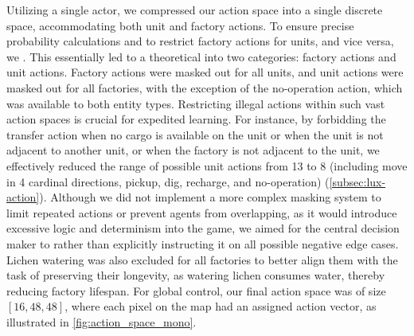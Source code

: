 \noindent Utilizing a single actor, we compressed our action space into a single discrete space, accommodating both unit and factory actions. To ensure precise probability calculations and to restrict factory actions for units, and vice versa, we . This essentially led to a theoretical  into two categories: factory actions and unit actions. Factory actions were masked out for all units, and unit actions were masked out for all factories, with the exception of the no-operation action, which was available to both entity types. Restricting illegal actions within such vast action spaces is crucial for expedited learning. For instance, by forbidding the transfer action when no cargo is available on the unit or when the unit is not adjacent to another unit, or when the factory is not adjacent to the unit, we effectively reduced the range of possible unit actions from 13 to 8 (including move in 4 cardinal directions, pickup, dig, recharge, and no-operation) (\autoref{subsec:lux-action}). Although we did not implement a more complex masking system to limit repeated actions or prevent agents from overlapping, as it would introduce excessive logic and determinism into the game, we aimed for the central decision maker to  rather than explicitly instructing it on all possible negative edge cases. Lichen watering was also excluded for all factories to better align them with the task of preserving their longevity, as watering lichen consumes water, thereby reducing factory lifespan. For global control, our final action space was of size $[16,48,48]$, where each pixel on the map had an assigned action vector, as illustrated in \autoref{fig:action_space_mono}.

